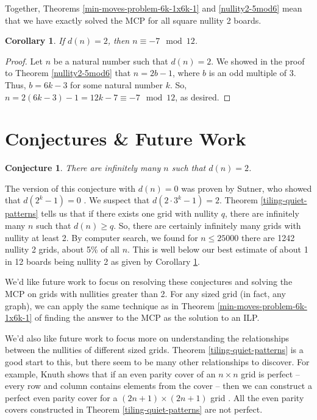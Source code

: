 \documentclass[a4paper]{article}
\newtheorem{corollary}{Corollary}[theorem]
\newtheorem{conjecture}{Conjecture}[section]
\begin{document}
	Together, Theorems \ref{min-moves-problem-6k-1x6k-1} and \ref{nullity2-5mod6} mean that we have exactly solved the MCP for all square nullity 2 boards.

	\begin{corollary}\label{nullity2-5mod12}
		If $d(n) = 2$, then $n \equiv -7 \mod 12$.
	\end{corollary}
	\begin{proof}
		Let $n$ be a natural number such that $d(n) = 2$.
		We showed in the proof to Theorem \ref{nullity2-5mod6} that $n = 2b - 1$, where $b$ is an odd multiple of 3.
		Thus, $b = 6k - 3$ for some natural number $k$.
		So, $n = 2(6k - 3) - 1 = 12k - 7 \equiv -7 \mod 12$, as desired.
	\end{proof}

	\section{Conjectures \& Future Work}
	\begin{conjecture}\label{infinite-nullity-2}
		There are infinitely many $n$ such that $d(n) = 2$.
	\end{conjecture}
	The version of this conjecture with $d(n) = 0$ was proven by Sutner, who showed that $d(2^k - 1) = 0$ \cite{Sutner1989}.
	We suspect that $d(2 \cdot 3^k - 1) = 2$.
	Theorem \ref{tiling-quiet-patterns} tells us that if there exists one grid with nullity $q$, there are infinitely many $n$ such that $d(n) \geq q$.
	So, there are certainly infinitely many grids with nullity at least 2.
	By computer search, we found for $n \leq 25000$ there are 1242 nullity 2 grids, about 5\% of all $n$.
	This is well below our best estimate of about 1 in 12  boards being nullity 2 as given by Corollary \ref{nullity2-5mod12}.
	
	We'd like future work to focus on resolving these conjectures and solving the MCP on grids with nullities greater than 2.
	For any sized grid (in fact, any graph), we can apply the same technique as in Theorem \ref{min-moves-problem-6k-1x6k-1} of finding the answer to the MCP as the solution to an ILP.
	
	We'd also like future work to focus more on understanding the relationships between the nullities of different sized grids.
	Theorem \ref{tiling-quiet-patterns} is a good start to this, but there seem to be many other relationships to discover.
	For example, Knuth shows that if an even parity cover of an $n \times n$ grid is perfect -- every row and column contains elements from the cover -- then we can construct a perfect even parity cover for a $(2n+1) \times (2n+1)$ grid \cite{Knuth_AOCP4A}.
	All the even parity covers constructed in Theorem \ref{tiling-quiet-patterns} are not perfect.
	
	\newpage
	
	
\end{document}
